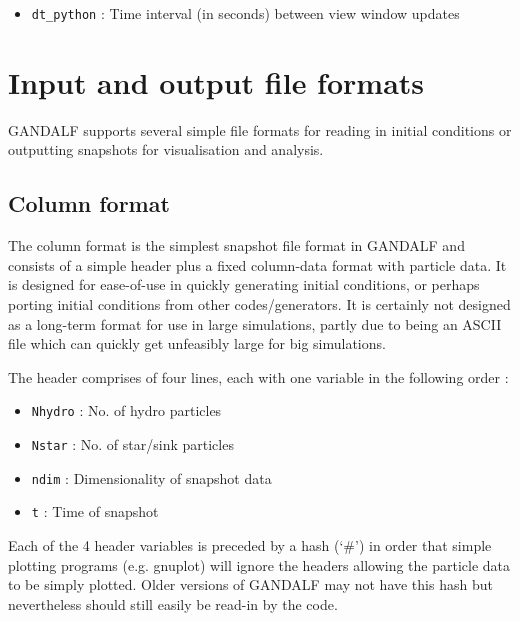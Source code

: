 \documentclass[a4paper]{article}
\newcommand{\var}[1]{\texttt{#1}}
\begin{document}
\begin{itemize}

\item \var{dt\_python} : Time interval (in seconds) between view window updates

\end{itemize}


\newpage



\section{Input and output file formats} \label{S:IO}

GANDALF supports several simple file formats for reading in initial conditions or outputting snapshots for visualisation and analysis.



\subsection{Column format}
The column format is the simplest snapshot file format in GANDALF and consists of a simple header plus a fixed column-data format with particle data.  It is designed for ease-of-use in quickly generating initial conditions, or perhaps porting initial conditions from other codes/generators.  It is certainly not designed as a long-term format for use in large simulations, partly due to being an ASCII file which can quickly get unfeasibly large for big simulations.

The header comprises of four lines, each with one variable in the following order :
\begin{itemize}
\item \var{Nhydro} : No. of hydro particles
\item \var{Nstar}  : No. of star/sink particles
\item \var{ndim}   : Dimensionality of snapshot data
\item \var{t}      : Time of snapshot
\end{itemize}
Each of the 4 header variables is preceded by a hash (`\#') in order that simple plotting programs (e.g. gnuplot) will ignore the headers allowing the particle data to be simply plotted.  Older versions of GANDALF may not have this hash but nevertheless should still easily be read-in by the code.
\end{document}
